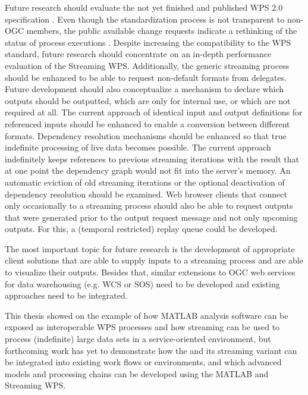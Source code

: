 Future research should evaluate the not yet finished and published WPS 2.0 specification \citep{ogc:wps2swg}. Even though the standardization process is not transparent to non-OGC members, the public available change requests indicate a rethinking of the status of process executions \citep[e.g.][]{ogc:wps:cr109}. Despite increasing the compatibility to the WPS standard, future research should concentrate on an in-depth performance evaluation of the Streaming WPS. Additionally, the generic streaming process should be enhanced to be able to request non-default formats from delegates. Future development should also conceptualize a mechanism to declare which outputs should be outputted, which are only for internal use, or which are not required at all. The current approach of identical input and output definitions for referenced inputs should be enhanced to enable a conversion between different formats. Dependency resolution mechanisms should be enhanced so that true indefinite processing of live data becomes possible. The current approach indefinitely keeps references to previous streaming iterations with the result that at one point the dependency graph would not fit into the server's memory. An automatic eviction of old streaming iterations or the optional deactivation of dependency resolution should be examined. Web browser clients that connect only occasionally to a streaming process should also be able to request outputs that were generated prior to the output request message and not only upcoming outputs. For this, a (temporal restricted) replay queue could be developed.

The most important topic for future research is the development of appropriate client solutions that are able to supply inputs to a streaming process and are able to visualize their outputs. Besides that, similar extensions to OGC web services for data warehousing (e.g. \ac{WCS} or \ac{SOS}) need to be developed and existing approaches \citep[e.g. for the \ac{WFS}, see ][]{aydin2006streaming} need to be integrated.

This thesis showed on the example of \la how MATLAB analysis software can be exposed as interoperable WPS processes and how streaming can be used to process (indefinite) large data sets in a service-oriented environment, but forthcoming work has yet to demonstrate how the \la and its streaming variant can be integrated into existing work flows or environments, and which advanced models and processing chains can be developed using the MATLAB and Streaming WPS.